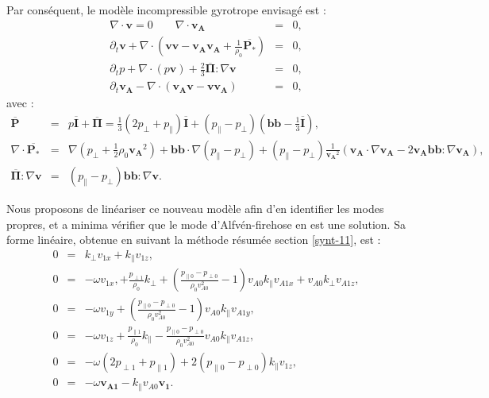 Par conséquent, le modèle incompressible gyrotrope envisagé est : 
\begin{eqnarray}
\label{eq:model_cpginc_r} \nabla \cdot \boldsymbol{v} = 0  \qquad \nabla \cdot \boldsymbol{v_A} &=& 0,\\
\label{eq:model_cpginc_v} \partial_t  \boldsymbol{v} + \nabla \cdot (\boldsymbol{v}\boldsymbol{v} - \boldsymbol{v_A}\boldsymbol{v_A} + \frac{1}{\rho_0} \overline{\boldsymbol{P_*}})  &=& 0 , \\
\label{eq:model_cpginc_p} \partial_t p + \nabla \cdot (p \boldsymbol{v} ) + \frac{2}{3} \overline{\boldsymbol{\Pi}} : \nabla \boldsymbol{v}   &=& 0  , \\
\label{eq:model_cpginc_b} \partial_t \boldsymbol{v_A} -  \nabla \cdot (\boldsymbol{v_A}\boldsymbol{v} - \boldsymbol{v}\boldsymbol{v_A}) &=& 0 ,
\end{eqnarray}
avec :
\begin{eqnarray*} 
\overline{\boldsymbol{P}} &=& p \overline{\boldsymbol{I}} +  \overline{\boldsymbol{\Pi}} =\frac{1}{3} (2 p_{\perp} + p_{\parallel} )\overline{\boldsymbol{I}} + (p_{\parallel} - p_{\perp})(\boldsymbol{b}\boldsymbol{b} - \frac{1}{3} \overline{\boldsymbol{I}} ) ,\\
 \nabla \cdot \overline{\boldsymbol{P_*}} &=& \nabla (p_{\perp}+\frac{1}{2} \rho_0\boldsymbol{v_A}^2) + \boldsymbol{b}\boldsymbol{b} \cdot \nabla (p_{\parallel}-p_{\perp}) + (p_{\parallel}-p_{\perp})\frac{1}{\boldsymbol{v_A}^2} (\boldsymbol{v_A} \cdot \nabla \boldsymbol{v_A} - 2 \boldsymbol{v_A}\boldsymbol{b}\boldsymbol{b}:\nabla \boldsymbol{v_A}),\\
 \overline{\boldsymbol{\Pi}} : \nabla \boldsymbol{v} &=& (p_{\parallel} - p_{\perp})\boldsymbol{b}\boldsymbol{b}: \nabla \boldsymbol{v}.
\end{eqnarray*}

 Nous proposons de linéariser ce nouveau modèle afin d'en identifier les modes propres, et a minima vérifier que le mode d'Alfvén-firehose en est une solution. Sa forme linéaire, obtenue en suivant la méthode résumée section \ref{synt-11}, est : 
\begin{eqnarray}
\label{eq:lin_cpginc_r}0&=& k_{\perp} v_{1x} + k_{\parallel} v_{1z},\\
\label{eq:lin_cpginc_vx} 0&=&-\omega  v_{1x} ,
+  \frac{p_{\perp 1}}{\rho_0} k_{\perp}   
 + (\frac{p_{\parallel 0}-p_{\perp 0}}{\rho_0 v_{A0}^2}-1) v_{A0}k_{\parallel}v_{A1x}+  v_{A0}  k_{\perp} v_{A1z},\\
 \label{eq:lin_cpginc_vy} 0&=&-\omega  v_{1y}   + (\frac{p_{\parallel 0}-p_{\perp 0}}{\rho_0 v_{A0}^2}-1) v_{A0}k_{\parallel}v_{A1y} ,
 \\
\label{eq:lin_cpginc_vz} 0&=&-\omega  v_{1z}
+ \frac{p_{\parallel 1}}{\rho_0}k_{\parallel} 
 -  \frac{p_{\parallel 0}-p_{\perp 0}}{\rho_0 v_{A0}^2} v_{A0}  k_{\parallel} v_{A1z}, \\
\label{eq:lin_cpginc_p}0&=& -\omega  (2p_{\perp 1}+ p_{\parallel 1})   + 2 (p_{\parallel 0} - p_{\perp 0}) k_{\parallel}v_{1z}    , \\
\label{eq:lin_cpginc_b}0&=& -\omega  \boldsymbol{v_{A1}} -   k_{\parallel} v_{A0}\boldsymbol{v_1}  .
\end{eqnarray}


